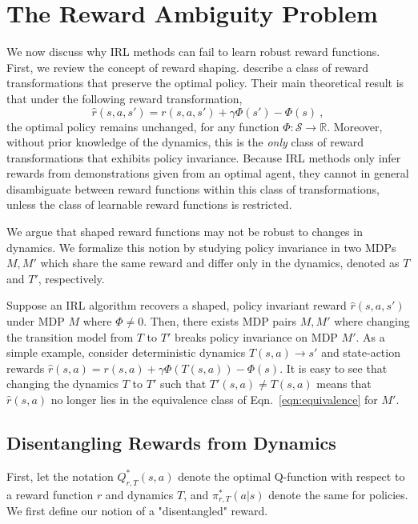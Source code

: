 \documentclass{article} \usepackage{iclr2018_conference,times}
\begin{document}
\section{The Reward Ambiguity Problem}
\label{sec:disentangle}

We now discuss why IRL methods can fail to learn robust reward functions. First, we review the concept of reward shaping. \citet{Ng1999} describe a class of reward transformations that preserve the optimal policy. Their main theoretical result is that under the following reward transformation,
\begin{equation}
\label{eqn:equivalence}
\hat{r}(s,a,s') = r(s,a,s') + \gamma \Phi(s') - \Phi(s) \ ,
\end{equation}
the optimal policy remains unchanged, for any function $\Phi: \mathcal{S} \to \mathbb{R}$. Moreover, without prior knowledge of the dynamics, this is the \textit{only} class of reward transformations that exhibits policy invariance. Because IRL methods only infer rewards from demonstrations given from an optimal agent, they cannot in general disambiguate between reward functions within this class of transformations, unless the class of learnable reward functions is restricted.

We argue that shaped reward functions may not be robust to changes in dynamics. We formalize this notion by studying policy invariance in two MDPs $M, M'$ which share the same reward and differ only in the dynamics, denoted as $T$ and $T'$, respectively. 

Suppose an IRL algorithm recovers a shaped, policy invariant reward $\hat{r}(s,a,s')$ under MDP $M$ where $\Phi \neq 0$. Then, there exists MDP pairs $M, M'$ where changing the transition model from $T$ to $T'$ breaks policy invariance on MDP $M'$. As a simple example, consider deterministic dynamics $T(s,a) \to s'$ and state-action rewards $\hat{r}(s,a) = r(s,a) + \gamma \Phi(T(s,a)) - \Phi(s)$. It is easy to see that changing the dynamics $T$ to $T'$ such that $T'(s,a) \neq T(s,a)$ means that $\hat{r}(s,a)$ no longer lies in the equivalence class of Eqn.~\ref{eqn:equivalence} for $M'$.

\subsection{Disentangling Rewards from Dynamics}
First, let the notation $Q^*_{r, T}(s,a)$ denote the optimal Q-function with respect to a reward function $r$ and dynamics $T$, and $\pi^*_{r, T}(a|s)$ denote the same for policies. We first define our notion of a "disentangled" reward.
\end{document}
